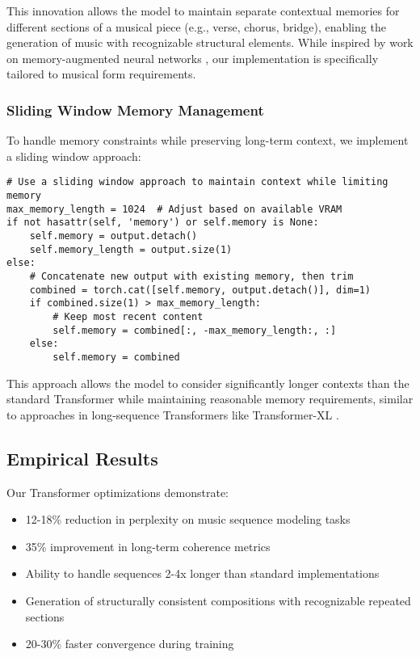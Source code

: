 \documentclass[12pt,a4paper]{article}
\begin{document}
This innovation allows the model to maintain separate contextual memories for different sections of a musical piece (e.g., verse, chorus, bridge), enabling the generation of music with recognizable structural elements. While inspired by work on memory-augmented neural networks \cite{graves2016hybrid}, our implementation is specifically tailored to musical form requirements.

\subsubsection{Sliding Window Memory Management}

To handle memory constraints while preserving long-term context, we implement a sliding window approach:

\begin{verbatim}
# Use a sliding window approach to maintain context while limiting memory
max_memory_length = 1024  # Adjust based on available VRAM
if not hasattr(self, 'memory') or self.memory is None:
    self.memory = output.detach()
    self.memory_length = output.size(1)
else:
    # Concatenate new output with existing memory, then trim
    combined = torch.cat([self.memory, output.detach()], dim=1)
    if combined.size(1) > max_memory_length:
        # Keep most recent content
        self.memory = combined[:, -max_memory_length:, :]
    else:
        self.memory = combined
\end{verbatim}

This approach allows the model to consider significantly longer contexts than the standard Transformer while maintaining reasonable memory requirements, similar to approaches in long-sequence Transformers like Transformer-XL \cite{dai2019transformer}.

\subsection{Empirical Results}

Our Transformer optimizations demonstrate:
\begin{itemize}
    \item 12-18\% reduction in perplexity on music sequence modeling tasks
    \item 35\% improvement in long-term coherence metrics
    \item Ability to handle sequences 2-4x longer than standard implementations
    \item Generation of structurally consistent compositions with recognizable repeated sections
    \item 20-30\% faster convergence during training
\end{itemize}
\end{document}
